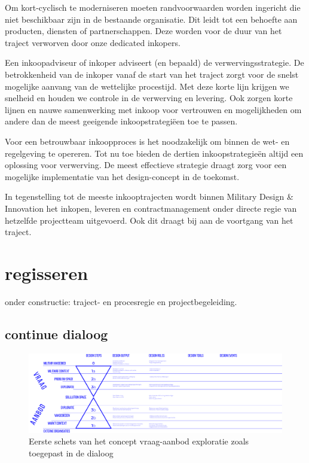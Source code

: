 \documentclass[
]{book}
\begin{document}
Om kort-cyclisch te moderniseren moeten randvoorwaarden worden ingericht die niet beschikbaar zijn in de bestaande organisatie. Dit leidt tot een behoefte aan producten, diensten of partnerschappen. Deze worden voor de duur van het traject verworven door onze dedicated inkopers.

Een inkoopadviseur of inkoper adviseert (en bepaald) de verwervingsstrategie. De betrokkenheid van de inkoper vanaf de start van het traject zorgt voor de snelst mogelijke aanvang van de wettelijke procestijd. Met deze korte lijn krijgen we snelheid en houden we controle in de verwerving en levering. Ook zorgen korte lijnen en nauwe samenwerking met inkoop voor vertrouwen en mogelijkheden om andere dan de meest geeigende inkoopstrategiëen toe te passen.

Voor een betrouwbaar inkoopproces is het noodzakelijk om binnen de wet- en regelgeving te opereren. Tot nu toe bieden de dertien inkoopstrategieën altijd een oplossing voor verwerving. De meest effectieve strategie draagt zorg voor een mogelijke implementatie van het design-concept in de toekomst.

In tegenstelling tot de meeste inkooptrajecten wordt binnen Military Design \& Innovation het inkopen, leveren en contractmanagement onder directe regie van hetzelfde projectteam uitgevoerd. Ook dit draagt bij aan de voortgang van het traject.

\hypertarget{regisseren}{%
\section{regisseren}\label{regisseren}}

onder constructie:
traject- en procesregie en projectbegeleiding.

\hypertarget{continue-dialoog}{%
\subsection{continue dialoog}\label{continue-dialoog}}

\begin{figure}
\includegraphics[width=116.58in]{data/images/20200426-CDE-designproces_vraag-aanbod-exploratie_blauwdruk-v2} \caption{Eerste schets van het concept vraag-aanbod exploratie zoals toegepast in de dialoog }\label{fig:vraag-aanbod}
\end{figure}
\end{document}
